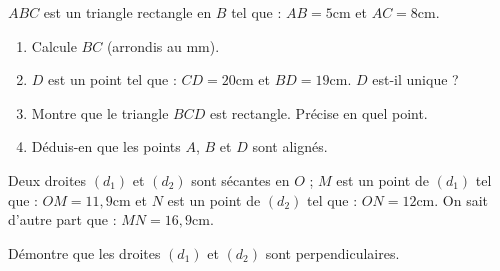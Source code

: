\documentclass[a4paper,10pt]{report}
\begin{document}
\begin{ex}
$ABC$ est un triangle rectangle en $B$ tel que : $AB=5$cm et $AC= 8$cm.
\begin{enumerate}[font=\color{exer2}]
\item Calcule $BC$ (arrondis au mm).
\item $D$ est un point tel que : $CD=20$cm et $BD= 19$cm. $D$ est-il unique ?
\item Montre que le triangle $BCD$ est rectangle. Précise en quel point.
\item Déduis-en que les points $A$, $B$ et $D$ sont alignés.
\end{enumerate}
\end{ex}

\begin{ex}
Deux droites $(d_1)$ et $(d_2)$ sont sécantes en $O$ ;
$M$ est un point de $(d_1)$ tel que : $OM=11,9$cm et $N$ est un point de $(d_2)$ tel que : $ON= 12$cm. On sait d'autre part que : $MN= 16,9$cm.


\medskip
\noindent Démontre que les droites $(d_1)$ et $(d_2)$ sont perpendiculaires.
\end{ex}
\end{document}
